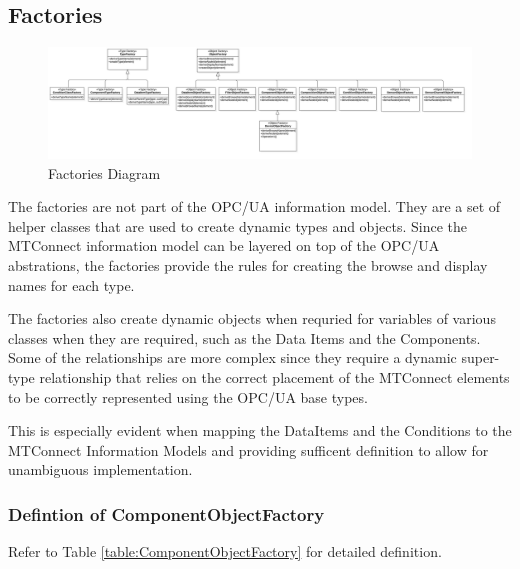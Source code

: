 \FloatBarrier

\subsection{Factories}

\begin{figure}
  \centering
    \includegraphics[width=1.0\textwidth]{diagrams/Factories.png}
  \caption{Factories Diagram}
  \label{fig:Factories}
\end{figure}

\FloatBarrier


The factories are not part of the OPC/UA information model. They are a set of helper 
classes that are used to create dynamic types and objects. Since the MTConnect 
information model can be layered on top of the OPC/UA abstrations, the factories
provide the rules for creating the browse and display names for each type.

The factories also create dynamic objects when requried for variables of various
classes when they are required, such as the Data Items and the Components. Some of the
relationships are more complex since they require a dynamic super-type relationship that
relies on the correct placement of the MTConnect elements to be correctly 
represented using the OPC/UA base types.

This is especially evident when mapping the DataItems and the Conditions to the 
MTConnect Information Models and providing sufficent definition to allow for 
unambiguous implementation.

\subsubsection{Defintion of ComponentObjectFactory} \label{type:ComponentObjectFactory}

\FloatBarrier



Refer to Table \ref{table:ComponentObjectFactory} for detailed definition.

